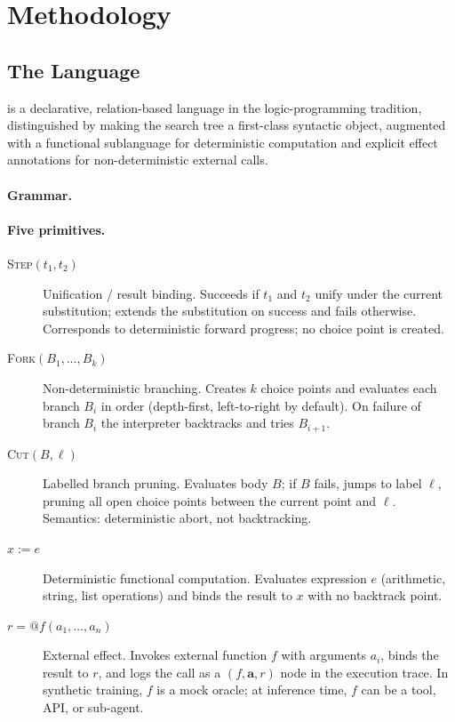 \section{Methodology}
\label{sec:methodology}

\subsection{The \gore{} Language}
\label{sec:language}

\gore{} is a declarative, relation-based language in the logic-programming
tradition, distinguished by making the search tree a first-class syntactic
object, augmented with a functional sublanguage for deterministic computation
and explicit effect annotations for non-deterministic external calls.

\paragraph{Grammar.}

\paragraph{Five primitives.}
\begin{description}
  \item[\textsc{Step}$(t_1, t_2)$] Unification / result binding.
    Succeeds if $t_1$ and $t_2$ unify under the current substitution; extends
    the substitution on success and fails otherwise.
    Corresponds to deterministic forward progress; no choice point is created.
  \item[\textsc{Fork}$(B_1, \ldots, B_k)$] Non-deterministic branching.
    Creates $k$ choice points and evaluates each branch $B_i$ in order
    (depth-first, left-to-right by default).
    On failure of branch $B_i$ the interpreter backtracks and tries $B_{i+1}$.
  \item[\textsc{Cut}$(B, \ell)$] Labelled branch pruning.
    Evaluates body $B$; if $B$ fails, jumps to label $\ell$, pruning all
    open choice points between the current point and $\ell$.
    Semantics: deterministic abort, not backtracking.
  \item[ $x \mathrel{:=} e$] Deterministic functional computation.
    Evaluates expression $e$ (arithmetic, string, list operations) and binds
    the result to $x$ with no backtrack point.
  \item[\callstmt{} $r \mathrel{=} @f(a_1, \ldots, a_n)$] External effect.
    Invokes external function $f$ with arguments $a_i$, binds the result to $r$,
    and logs the call as a $(f, \mathbf{a}, r)$ node in the execution trace.
    In synthetic training, $f$ is a mock oracle; at inference time, $f$ can be a
    tool, API, or sub-agent.
\end{description}

